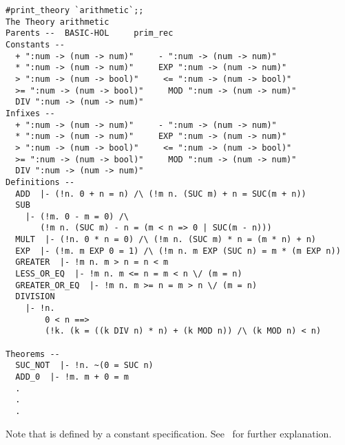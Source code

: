 \begin{session}\begin{verbatim}
#print_theory `arithmetic`;;
The Theory arithmetic
Parents --  BASIC-HOL     prim_rec
Constants --
  + ":num -> (num -> num)"     - ":num -> (num -> num)"
  * ":num -> (num -> num)"     EXP ":num -> (num -> num)"
  > ":num -> (num -> bool)"     <= ":num -> (num -> bool)"
  >= ":num -> (num -> bool)"     MOD ":num -> (num -> num)"
  DIV ":num -> (num -> num)"
Infixes --
  + ":num -> (num -> num)"     - ":num -> (num -> num)"
  * ":num -> (num -> num)"     EXP ":num -> (num -> num)"
  > ":num -> (num -> bool)"     <= ":num -> (num -> bool)"
  >= ":num -> (num -> bool)"     MOD ":num -> (num -> num)"
  DIV ":num -> (num -> num)"
Definitions --
  ADD  |- (!n. 0 + n = n) /\ (!m n. (SUC m) + n = SUC(m + n))
  SUB
    |- (!m. 0 - m = 0) /\
       (!m n. (SUC m) - n = (m < n => 0 | SUC(m - n)))
  MULT  |- (!n. 0 * n = 0) /\ (!m n. (SUC m) * n = (m * n) + n)
  EXP  |- (!m. m EXP 0 = 1) /\ (!m n. m EXP (SUC n) = m * (m EXP n))
  GREATER  |- !m n. m > n = n < m
  LESS_OR_EQ  |- !m n. m <= n = m < n \/ (m = n)
  GREATER_OR_EQ  |- !m n. m >= n = m > n \/ (m = n)
  DIVISION
    |- !n.
        0 < n ==>
        (!k. (k = ((k DIV n) * n) + (k MOD n)) /\ (k MOD n) < n)

Theorems --
  SUC_NOT  |- !n. ~(0 = SUC n)
  ADD_0  |- !m. m + 0 = m
  .
  .
  .
\end{verbatim}\end{session}

\noindent Note that  is defined by a constant specification. See
\DESCRIPTION\ for further explanation.















